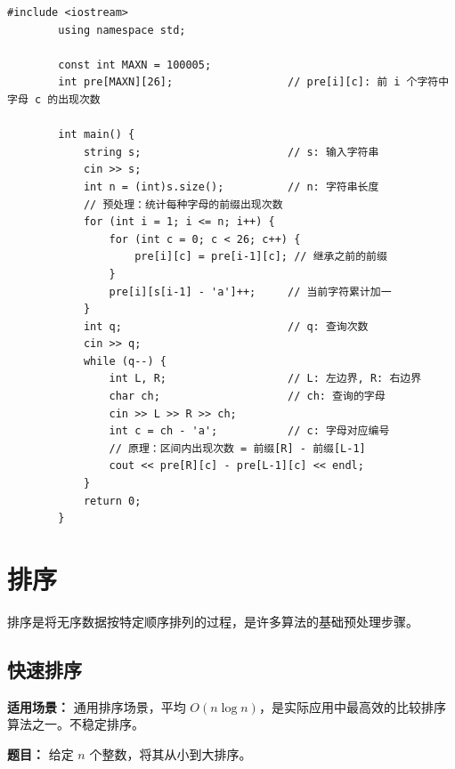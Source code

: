 \documentclass[12pt,a4paper]{ctexart}
\begin{document}
	\begin{lstlisting}[caption={前缀和——区间内字母出现次数}]
		#include <iostream>
		using namespace std;
		
		const int MAXN = 100005;
		int pre[MAXN][26];                  // pre[i][c]: 前 i 个字符中字母 c 的出现次数
		
		int main() {
			string s;                       // s: 输入字符串
			cin >> s;
			int n = (int)s.size();          // n: 字符串长度
			// 预处理：统计每种字母的前缀出现次数
			for (int i = 1; i <= n; i++) {
				for (int c = 0; c < 26; c++) {
					pre[i][c] = pre[i-1][c]; // 继承之前的前缀
				}
				pre[i][s[i-1] - 'a']++;     // 当前字符累计加一
			}
			int q;                          // q: 查询次数
			cin >> q;
			while (q--) {
				int L, R;                   // L: 左边界, R: 右边界
				char ch;                    // ch: 查询的字母
				cin >> L >> R >> ch;
				int c = ch - 'a';           // c: 字母对应编号
				// 原理：区间内出现次数 = 前缀[R] - 前缀[L-1]
				cout << pre[R][c] - pre[L-1][c] << endl;
			}
			return 0;
		}
	\end{lstlisting}
	
	\newpage
	
	\section{排序}
	排序是将无序数据按特定顺序排列的过程，是许多算法的基础预处理步骤。
	
	\subsection{快速排序}
	\textbf{适用场景：} 通用排序场景，平均 \(O(n\log n)\)，是实际应用中最高效的比较排序算法之一。不稳定排序。
	
	\textbf{题目：} 给定 \(n\) 个整数，将其从小到大排序。
	
\end{document}
